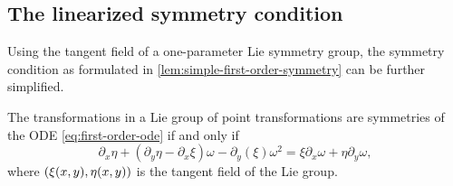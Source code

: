 \subsection{The linearized symmetry condition}

Using the tangent field of a one-parameter Lie symmetry group, the symmetry condition as formulated in \cref{lem:simple-first-order-symmetry} can be further simplified.
\begin{lem} \label{lem:linearized-first-order-symmetry}
  The transformations in a Lie group of point transformations are symmetries of the ODE \ref{eq:first-order-ode} if and only if
  \begin{equation}
    \partial_x \eta + (\partial_y \eta - \partial_x \xi) \omega - \partial_y (\xi) \omega^2 =
    \xi \partial_x \omega + \eta \partial_y \omega,
  \end{equation}
  where \(\pqty{\xi(x,y), \eta(x,y)}\) is the tangent field of the Lie group.
\end{lem}

